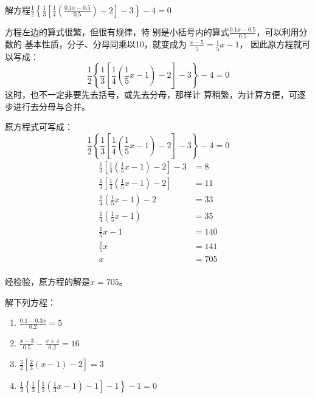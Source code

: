 \begin{example}
    解方程$\frac{1}{2}\left\{\frac{1}{3}\left[\frac{1}{4}\left(\frac{0.1x-0.5}{0.5}\right)-2\right]-3\right\}-4=0$
\end{example}

\begin{analyze}
方程左边的算式很繁，但很有规律，特
    别是小括号内的算式$\frac{0.1x-0.5}{0.5}$，可以利用分数的
    基本性质，分子、分母同乘以10，就变成为
$\frac{x-5}{5}=\frac{1}{5}x-1$，
    因此原方程就可以写成：
   \[\frac{1}{2}\left\{\frac{1}{3}\left[\frac{1}{4}\left(\frac{1}{5}x-1\right)-2\right]-3\right\}-4=0 \]
    这时，也不一定非要先去括号，或先去分母，那样计
    算稍繁，为计算方便，可逐步进行去分母与合并。
\end{analyze}

\begin{solution}
    原方程式可写成：\[\frac{1}{2}\left\{\frac{1}{3}\left[\frac{1}{4}\left(\frac{1}{5}x-1\right)-2\right]-3\right\}-4=0 \]
\begin{align*}
    \frac{1}{3}\left[\frac{1}{4}\left(\frac{1}{5}x-1\right)-2\right]-3 &=8  \tag{两边乘以2}\\
    \frac{1}{3}\left[\frac{1}{4}\left(\frac{1}{5}x-1\right)-2\right]&=11   \tag{移项、合并}\\
    \frac{1}{4}\left(\frac{1}{5}x-1\right)-2&=33  \tag{两边乘以3}\\
    \frac{1}{4}\left(\frac{1}{5}x-1\right)&=35   \tag{移项、合并}\\
    \frac{1}{5}x-1&=140 \tag{两边乘以4}\\
    \frac{1}{5}x&=141  \tag{移项、合并}\\
    x&=705  \tag{两边乘以5}\\
\end{align*}   

经检验，原方程的解是$x=705$。
\end{solution}

\begin{ex}
解下列方程：
\begin{enumerate}
    \item $\frac{0.1-0.3x}{0.2}=5$
    \item $\frac{x-3}{0.5}-\frac{x+4}{0.2}=16$
    \item $\frac{3}{2}\left[\frac{2}{3}(x-1)-2\right]=3$
    \item $\frac{1}{3}\left\{\frac{1}{3}\left[\frac{1}{3}\left(\frac{1}{3}x-1\right)-1\right]-1\right\}-1=0$
\end{enumerate}
\end{ex}

